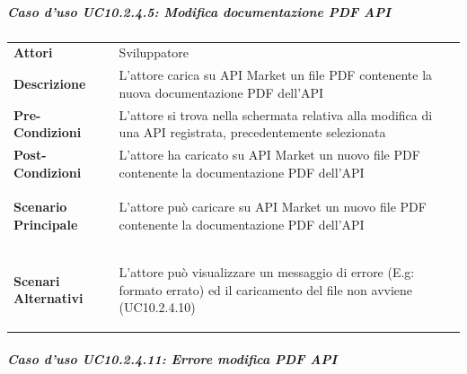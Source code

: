 \subparagraph{Caso d'uso UC10.2.4.5: Modifica documentazione PDF API}
\label{UC10_2_4_5}

\begin{minipage}{\linewidth}
	\begin{tabular}{ l | p{11cm}}
		\hline
		\rowcolor{Gray}
		\multicolumn{2}{c}{UC10.2.4.5 - Modifica documentazione PDF API} \\
		\hline
		\textbf{Attori} & Sviluppatore \\
		\textbf{Descrizione} & L'attore carica su API Market un file PDF contenente la nuova documentazione PDF dell'API \\
		\textbf{Pre-Condizioni} & L'attore si trova nella schermata relativa alla modifica di una API registrata, precedentemente selezionata \\
		\textbf{Post-Condizioni} & L'attore ha caricato su API Market un nuovo file PDF contenente la documentazione PDF dell'API \\
		\textbf{Scenario Principale} & 
		\begin{enumerate*}[label=(\arabic*.),itemjoin={\newline}]
			\item L'attore può caricare su API Market un nuovo file PDF contenente la documentazione PDF dell'API
		\end{enumerate*}\\
		\textbf{Scenari Alternativi} & 
		\begin{enumerate*}[label=(\arabic*.),itemjoin={\newline}]
			\item L'attore può visualizzare un messaggio di errore (E.g: formato errato) ed il caricamento del file non avviene (UC10.2.4.10)
		\end{enumerate*}\\
	\end{tabular}
\end{minipage}

\subparagraph{Caso d'uso UC10.2.4.11: Errore modifica PDF API}
\label{UC10_2_4_11}

